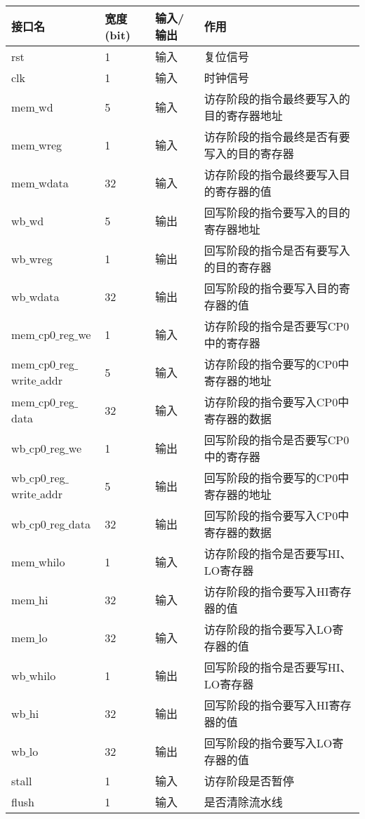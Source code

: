 	\begin{longtable}{|l|l|l|l|}
		\hline
		接口名 & 宽度(bit) & 输入/输出 & 作用 \\
		\hline
		rst & 1 & 输入 & 复位信号 \\
		\hline
		clk & 1 & 输入 & 时钟信号 \\
		\hline
		mem$\_$wd & 5 & 输入 & 访存阶段的指令最终要写入的目的寄存器地址 \\
		\hline
		mem$\_$wreg & 1 & 输入 & 访存阶段的指令最终是否有要写入的目的寄存器 \\
		\hline
		mem$\_$wdata & 32 & 输入 & 访存阶段的指令最终要写入目的寄存器的值 \\
		\hline
		wb$\_$wd & 5 & 输出 & 回写阶段的指令要写入的目的寄存器地址 \\
		\hline
		wb$\_$wreg & 1 & 输出 & 回写阶段的指令是否有要写入的目的寄存器 \\
		\hline
		wb$\_$wdata & 32 & 输出 & 回写阶段的指令要写入目的寄存器的值 \\
		\hline
		mem$\_$cp0$\_$reg$\_$we & 1 & 输入 & 访存阶段的指令是否要写CP0中的寄存器 \\
		\hline
		mem$\_$cp0$\_$reg$\_$write$\_$addr & 5 & 输入 & 访存阶段的指令要写的CP0中寄存器的地址 \\
		\hline
		mem$\_$cp0$\_$reg$\_$data & 32 & 输入 & 访存阶段的指令要写入CP0中寄存器的数据 \\
		\hline
		wb$\_$cp0$\_$reg$\_$we & 1 & 输出 & 回写阶段的指令是否要写CP0中的寄存器 \\
		\hline
		wb$\_$cp0$\_$reg$\_$write$\_$addr & 5 & 输出 & 回写阶段的指令要写的CP0中寄存器的地址 \\
		\hline
		wb$\_$cp0$\_$reg$\_$data & 32 & 输出 & 回写阶段的指令要写入CP0中寄存器的数据 \\
		\hline
		mem$\_$whilo & 1 & 输入 & 访存阶段的指令是否要写HI、LO寄存器 \\
		\hline
		mem$\_$hi & 32 & 输入 & 访存阶段的指令要写入HI寄存器的值 \\
		\hline
		mem$\_$lo & 32 & 输入 & 访存阶段的指令要写入LO寄存器的值 \\
		\hline
		wb$\_$whilo & 1 & 输出 & 回写阶段的指令是否要写HI、LO寄存器 \\
		\hline
		wb$\_$hi & 32 & 输出 & 回写阶段的指令要写入HI寄存器的值 \\
		\hline
		wb$\_$lo & 32 & 输出 & 回写阶段的指令要写入LO寄存器的值 \\
		\hline
		stall & 1 & 输入 & 访存阶段是否暂停 \\
		\hline
		flush & 1 & 输入 & 是否清除流水线 \\
		\hline
	\end{longtable}
